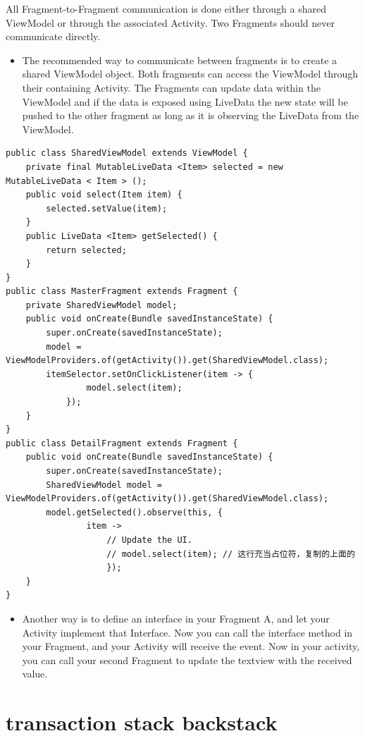 \documentclass[9pt, b5paaper]{book}
\begin{document}
All Fragment-to-Fragment communication is done either through a shared ViewModel or through the associated Activity. Two Fragments should never communicate directly.

\begin{itemize}
\item The recommended way to communicate between fragments is to create a shared ViewModel object. Both fragments can access the ViewModel through their containing Activity. The Fragments can update data within the ViewModel and if the data is exposed using LiveData the new state will be pushed to the other fragment as long as it is observing the LiveData from the ViewModel.
\end{itemize}
\begin{verbatim}
public class SharedViewModel extends ViewModel {
    private final MutableLiveData <Item> selected = new MutableLiveData < Item > ();
    public void select(Item item) {
        selected.setValue(item);
    }
    public LiveData <Item> getSelected() {
        return selected;
    }
}
public class MasterFragment extends Fragment {
    private SharedViewModel model;
    public void onCreate(Bundle savedInstanceState) {
        super.onCreate(savedInstanceState);
        model = ViewModelProviders.of(getActivity()).get(SharedViewModel.class);
        itemSelector.setOnClickListener(item -> {
                model.select(item);
            });
    }
}
public class DetailFragment extends Fragment {
    public void onCreate(Bundle savedInstanceState) {
        super.onCreate(savedInstanceState);
        SharedViewModel model = ViewModelProviders.of(getActivity()).get(SharedViewModel.class);
        model.getSelected().observe(this, {
                item ->
                    // Update the UI.
                    // model.select(item); // 这行充当占位符，复制的上面的
                    });
    }
}
\end{verbatim}
\begin{itemize}
\item Another way is to define an interface in your Fragment A, and let your Activity implement that Interface. Now you can call the interface method in your Fragment, and your Activity will receive the event. Now in your activity, you can call your second Fragment to update the textview with the received value.
\end{itemize}

\section{transaction stack backstack}
\label{sec-6-1}
\end{document}
